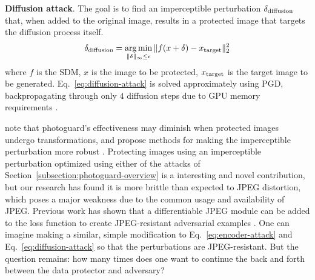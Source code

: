 \documentclass{article} %
\begin{document}
\textbf{Diffusion attack}. The goal is to find an imperceptible perturbation $\delta_{\rm diffusion}$ that, when added to the original image, results in a protected image that targets the diffusion process itself.
\begin{equation}
    \delta_{\rm diffusion} = \operatorname*{arg\,min}_{\|\delta\|_{\infty} \leq \epsilon} \|f(x + \delta) - x_{\rm target} \|_{2}^{2}
    \label{eq:diffusion-attack}
\end{equation}
where $f$ is the SDM, $x$ is the image to be protected, $x_{\rm target}$ is the target image to be generated. Eq.~\ref{eq:diffusion-attack} is solved approximately using PGD, backpropagating through only $4$ diffusion steps due to GPU memory requirements \citep{salman2023raising}.



\cite{salman2023raising} note that photoguard's effectiveness may diminish when protected images undergo transformations, and propose methods for making the imperceptible perturbation more robust \citep{athalye2018synthesizing}. Protecting images using an imperceptible perturbation optimized using either of the attacks of Section~\ref{subsection:photoguard-overview} is a interesting and novel contribution, but our research has found it is more brittle than expected to JPEG distortion, which poses a major weakness due to the common usage and availability of JPEG. Previous work has shown that a differentiable JPEG module can be added to the loss function to create JPEG-resistant adversarial examples \citep{shin2017jpeg}. One can imagine making a similar, simple modification to Eq.~\ref{eq:encoder-attack} and Eq.~\ref{eq:diffusion-attack} so that the perturbations are JPEG-resistant. But the question remains: how many times does one want to continue the back and forth between the data protector and adversary?


\end{document}
